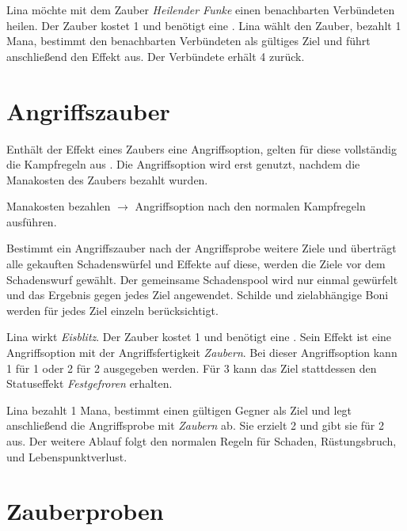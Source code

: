 \begin{beispiel}[title=Beispiel: Einen unterstützenden Zauber wirken]
Lina möchte mit dem Zauber \emph{Heilender Funke} einen benachbarten Verbündeten heilen. Der Zauber kostet 1\manaLoss{} und benötigt eine \moveAction. Lina wählt den Zauber, bezahlt 1 Mana, bestimmt den benachbarten Verbündeten als gültiges Ziel und führt anschließend den Effekt aus. Der Verbündete erhält 4\lifeGain{} zurück.
\end{beispiel}

\section{Angriffszauber}

Enthält der Effekt eines Zaubers eine Angriffsoption, gelten für diese vollständig die Kampfregeln aus . Die Angriffsoption wird erst genutzt, nachdem die Manakosten des Zaubers bezahlt wurden.

\begin{kurzregel}[title=Angriffszauber]
Manakosten bezahlen $\rightarrow$ Angriffsoption nach den normalen Kampfregeln ausführen.
\end{kurzregel}

Bestimmt ein Angriffszauber nach der Angriffsprobe weitere Ziele und überträgt alle gekauften Schadenswürfel und Effekte auf diese, werden die Ziele vor dem Schadenswurf gewählt. Der gemeinsame Schadenspool wird nur einmal gewürfelt und das Ergebnis gegen jedes Ziel angewendet. Schilde und zielabhängige Boni werden für jedes Ziel einzeln berücksichtigt.

\begin{beispiel}[title=Beispiel: Eisblitz]
Lina wirkt \emph{Eisblitz}. Der Zauber kostet 1\manaLoss{} und benötigt eine \standardAction. Sein Effekt ist eine Angriffsoption mit der Angriffsfertigkeit \emph{Zaubern}. Bei dieser Angriffsoption kann 1\star{} für 1\redDmgDie{} oder 2\star{} für 2\redDmgDie{} ausgegeben werden. Für 3\star{} kann das Ziel stattdessen den Statuseffekt \emph{Festgefroren} erhalten.

Lina bezahlt 1 Mana, bestimmt einen gültigen Gegner als Ziel und legt anschließend die Angriffsprobe mit \emph{Zaubern} ab. Sie erzielt 2\star{} und gibt sie für 2\redDmgDie{} aus. Der weitere Ablauf folgt den normalen Regeln für Schaden, Rüstungsbruch, \armor{} und Lebenspunktverlust.
\end{beispiel}

\section{Zauberproben}

